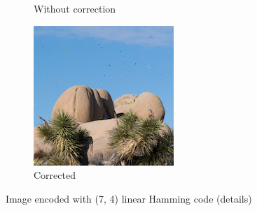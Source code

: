 \documentclass{article}
\begin{document}
\begin{figure}[htb]
\begin{subfigure}[b]{0.32\textwidth}
        \caption{Without correction}
        \label{fig:cropped-image-linear-no-correction}
    \end{subfigure}
    \hfill
    \begin{subfigure}[b]{0.32\textwidth}
        \centering
        \includegraphics[width=\textwidth]{../Result/Linear/cropped-linear-bsc-output-syndrome-corrected.png}
        \caption{Corrected}
        \label{fig:cropped-image-linear-syndrome-corrected}
    \end{subfigure}
       \caption{Image encoded with (7, 4) linear Hamming code (details)}
       \label{fig:cropped-image-linear}
\end{figure}
\end{document}
